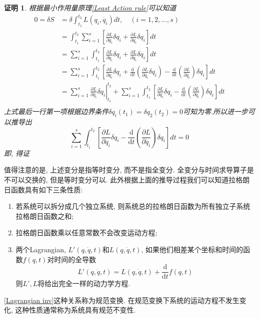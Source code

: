 \documentclass[a4paper,11pt]{article}
\theoremstyle{mystyle}
\newtheorem{Proof}{\hspace{2em}证明}[section]
\begin{document}
\begin{Proof}
  根据最小作用量原理\ref{Least Action rule}可以知道
  \begin{equation*}
    \begin{split}
       0=\delta S &= \delta\int_{t_1}^{t_2}L(q_i,\dot{q_i})dt,\quad (i=1,2,\dots,s) \\
         & =\int_{t_1}^{t_2}\sum_{i=1}^{s}\left[\frac{\partial L}{\partial{q_i}}\delta q_i+\frac{\partial{L}}{\partial{\dot{q_i}}}\delta q_i\right]dt \\
         & =\sum_{i=1}^{s}\int_{t_1}^{t_2}\left[\frac{\partial L}{\partial{q_i}}\delta q_i+\frac{\partial L}{\partial{\dot{q_i}}}\delta\dot{q_i}\right]dt \\
         & =\sum_{i=1}^{s}\int_{t_1}^{t_2}\left[\frac{\partial L}{\partial{q_i}}\delta q_i+\frac{\mathrm{d}}{\mathrm{d}t}\left(\frac{\partial L}{\partial{\dot{q_i}}}\delta q_i\right)-\frac{\mathrm{d}}{\mathrm{d}t}\left(\frac{\partial L}{\partial{\dot{q_i}}}\right)\delta q_i\right]dt \\
         & \left.=\sum_{i=1}^{s}\frac{\partial L}{\partial{\dot{q_i}}}\delta q_i\right|^{t_2}_{t_1}+\sum_{i=1}^{s}\int_{t_1}^{t_2}\left[\frac{\partial L}{\partial{q_i}}\delta q_i-\frac{\mathrm{d}}{\mathrm{d}t}\left(\frac{\partial L}{\partial{\dot{q_i}}}\right)\delta q_i\right]dt \\
    \end{split}
  \end{equation*}
  上式最后一行第一项根据边界条件$\delta q_i(t_1)=\delta q_2(t_2)=0$可知为零.所以进一步可以推导出
  \begin{equation*}
    \sum_{i=1}^{s}\int_{t_1}^{t_2}\left[\frac{\partial L}{\partial{q_i}}\delta q_i-\frac{\mathrm{d}}{\mathrm{d}t}\left(\frac{\partial L}{\partial{\dot{q_i}}}\right)\delta q_i\right]dt=0
  \end{equation*}
  即, 得证
\end{Proof}
值得注意的是, 上述变分是指等时变分, 而不是指全变分. 全变分与时间求导算子是不可以交换的, 但是等时变分可以. 此外根据上面的推导过程我们可以知道拉格朗日函数具有如下三条性质:
\begin{enumerate}[(1)]
  \item 若系统可以拆分成几个独立系统, 则系统总的拉格朗日函数为所有独立子系统拉格朗日函数之和;
  \item 拉格朗日函数乘以任意常数不会改变运动方程;
  \item\label{Lagrangian inv} 两个Lagrangian, $L'(q,\dot{q},t)$和$L(q,\dot{q},t)$, 如果他们相差某个坐标和时间的函数$f(q,t)$对时间的全导数
  \begin{equation*}
    L'(q,\dot{q},t)=L(q,\dot{q},t)+\frac{\mathrm{d}}{\mathrm{d}t}f(q,t)
  \end{equation*}
  则$L',L$将给出完全一样的动力学方程.
\end{enumerate}
\ref{Lagrangian inv}这种关系称为规范变换. 在规范变换下系统的运动方程不发生变化, 这种性质通常称为系统具有规范不变性.
\end{document}
